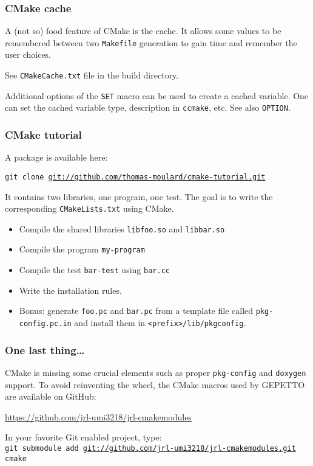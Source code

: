 \documentclass[hyperref={pdfpagelabels=false}]{beamer}
\begin{document}
\begin{frame}[fragile]
\frametitle{CMake cache}

A (not so) food feature of CMake is the cache. It allows some values
to be remembered between two \texttt{Makefile} generation to gain time
and remember the user choices.


See \texttt{CMakeCache.txt} file in the build directory.

\vspace{0.3cm}

Additional options of the \texttt{SET} macro can be used to create a
cached variable. One can set the cached variable type, description in
\texttt{ccmake}, etc. See also \texttt{OPTION}.

\end{frame}


\begin{frame}[fragile]
\frametitle{CMake tutorial}

A package is available here:

\vspace{0.1cm}

\texttt{git clone \url{git://github.com/thomas-moulard/cmake-tutorial.git}}

\vspace{0.3cm}

It contains two libraries, one program, one test. The goal is to write
the corresponding \texttt{CMakeLists.txt} using CMake.

\begin{itemize}
\item Compile the shared libraries \texttt{libfoo.so} and \texttt{libbar.so}
\item Compile the program \texttt{my-program}
\item Compile the test \texttt{bar-test} using \texttt{bar.cc}
\item Write the installation rules.
\item Bonus: generate \texttt{foo.pc} and \texttt{bar.pc} from a
  template file called \texttt{pkg-config.pc.in} and install them in
  \texttt{<prefix>/lib/pkgconfig}.
\end{itemize}

\end{frame}


\begin{frame}[fragile]
\frametitle{One last thing\ldots}

CMake is missing some crucial elements such as proper
\texttt{pkg-config} and \texttt{doxygen} support. To avoid reinventing
the wheel, the CMake macros used by GEPETTO are available on GitHub:

\vspace{0.2cm}

\url{https://github.com/jrl-umi3218/jrl-cmakemodules}

\vspace{0.3cm}

In your favorite Git enabled project, type:\\
\texttt{git submodule add \url{git://github.com/jrl-umi3218/jrl-cmakemodules.git} cmake}

\end{frame}
\end{document}
